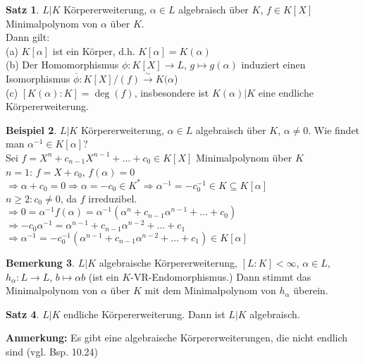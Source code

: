 \documentclass[10pt,a4paper,numbers=endperiod]{scrreprt}
\theoremstyle{definition}
\newtheorem{satz}{Satz}[section]
\newtheorem{bem}[satz]{Bemerkung}
\newtheorem{bsp}[satz]{Beispiel}
\begin{document}
\begin{satz}
	$L|K$ Körpererweiterung, $\alpha \in L$ algebraisch über $K$, $f \in K[X]$ Minimalpolynom von $\alpha$ über $K$.\\
	Dann gilt:\\
	(a) $K[\alpha]$ ist ein Körper, d.h. $K[\alpha] = K(\alpha)$\\
	(b) Der Homomorphismus $\phi: K[X] \rightarrow L$, $g \mapsto g(\alpha)$ induziert einen Isomorphismus $\overline{\phi}: K[X]/(f) \overset{\sim}{\rightarrow} K(\alpha$)\\
	(c) $[K(\alpha): K] = \deg (f)$, insbesondere ist $K(\alpha)|K$ eine endliche Körpererweiterung.
\end{satz}

\begin{bsp}
	$L|K$ Körpererweiterung, $\alpha \in L$ algebraisch über $K$, $\alpha \neq 0$. Wie findet man $\alpha^{-1} \in K[\alpha]$?\\
	Sei $f = X^n+ c_{n-1} X^{n-1} + \ldots + c_0 \in K[X]$ Minimalpolynom über $K$\\
	$n = 1$: $f = X+ c_0$, $f(\alpha) = 0$ $\Rightarrow \alpha + c_0 = 0 \Rightarrow \alpha = -c_0 \in K^* \Rightarrow \alpha^{-1} = -c_0^{-1} \in K \subseteq K[\alpha]$\\
	$n \geq 2: c_0 \neq 0$, da $f$ irreduzibel.\\
	$\Rightarrow 0 = \alpha^{-1} f(\alpha) = \alpha^{-1} (\alpha^n + c_{n-1} \alpha^{n-1} + \ldots + c_0)$\\
	$\Rightarrow -c_0\alpha^{-1} = \alpha^{n-1} + c_{n-1} \alpha^{n-2} + \ldots + c_1$\\
	$\Rightarrow \alpha^{-1} = -c_0^{-1} (\alpha^{n-1} + c_{n-1} \alpha^{n-2} + \ldots + c_1) \in K[\alpha]$
\end{bsp}

\begin{bem}
	$L|K$ algebraische Körpererweiterung, $[L:K] < \infty$, $\alpha \in L$, $h_\alpha: L \rightarrow L$, $b \mapsto \alpha b$ (ist ein $K$-VR-Endomorphismus.) Dann stimmt das Minimalpolynom von $\alpha$ über $K$ mit dem Minimalpolynom von $h_\alpha$ überein.
\end{bem}

\begin{satz}
	$L|K$ endliche Körpererweiterung. Dann ist $L|K$ algebraisch.
\end{satz}

\textbf{Anmerkung:} Es gibt eine algebraische Körpererweiterungen, die nicht endlich sind (vgl. Bsp. 10.24)\\
\end{document}
